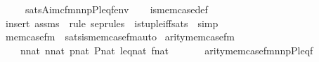 \begin{isabellebody}
\ \ \ \ {\isasymlongleftrightarrow}\ sats{\isacharparenleft}{\kern0pt}A{\isacharcomma}{\kern0pt}{\isacharquery}{\kern0pt}imc{\isacharunderscore}{\kern0pt}fm{\isacharparenleft}{\kern0pt}n{}{\isacharcomma}{\kern0pt}n{}{\isacharcomma}{\kern0pt}p{\isacharcomma}{\kern0pt}P{\isacharcomma}{\kern0pt}leq{\isacharcomma}{\kern0pt}f{\isacharparenright}{\kern0pt}{\isacharcomma}{\kern0pt}env{\isacharparenright}{\kern0pt}{\isachardoublequoteclose}\isanewline
%
\isadelimproof
\ \ %
\endisadelimproof
%
\isatagproof
{}\isamarkupfalse%
\ is{\isacharunderscore}{\kern0pt}mem{\isacharunderscore}{\kern0pt}case{\isacharunderscore}{\kern0pt}def\isanewline
\ \ \isamarkupfalse%
\ {\isacharparenleft}{\kern0pt}insert\ assms\ {\isacharsemicolon}{\kern0pt}\ {\isacharparenleft}{\kern0pt}rule\ sep{\isacharunderscore}{\kern0pt}rules{\isacharprime}{\kern0pt}\ \ is{\isacharunderscore}{\kern0pt}tuple{\isacharunderscore}{\kern0pt}iff{\isacharunderscore}{\kern0pt}sats\ {\isacharbar}{\kern0pt}\ simp{\isacharparenright}{\kern0pt}{\isacharplus}{\kern0pt}{\isacharparenright}{\kern0pt}%
\endisatagproof
{\isafoldproof}%
%
\isadelimproof
\isanewline
%
\endisadelimproof
\isanewline
%
\isadelimML
\isanewline
%
\endisadelimML
%
\isatagML
{}\isamarkupfalse%
\ {\isachardoublequoteopen}mem{\isacharunderscore}{\kern0pt}case{\isacharunderscore}{\kern0pt}fm{\isachardoublequoteclose}\ \ sats{\isacharunderscore}{\kern0pt}is{\isacharunderscore}{\kern0pt}mem{\isacharunderscore}{\kern0pt}case{\isacharunderscore}{\kern0pt}fm{\isacharunderscore}{\kern0pt}auto%
\endisatagML
{\isafoldML}%
%
\isadelimML
\isanewline
%
\endisadelimML
\isanewline
{}\isamarkupfalse%
\ arity{\isacharunderscore}{\kern0pt}mem{\isacharunderscore}{\kern0pt}case{\isacharunderscore}{\kern0pt}fm\ {\isacharcolon}{\kern0pt}\isanewline
\ \ \isanewline
\ \ \ \ {\isachardoublequoteopen}n{}{\isasymin}nat{\isachardoublequoteclose}\ {\isachardoublequoteopen}n{}{\isasymin}nat{\isachardoublequoteclose}\ {\isachardoublequoteopen}p{\isasymin}nat{\isachardoublequoteclose}\ {\isachardoublequoteopen}P{\isasymin}nat{\isachardoublequoteclose}\ {\isachardoublequoteopen}leq{\isasymin}nat{\isachardoublequoteclose}\ {\isachardoublequoteopen}f{\isasymin}nat{\isachardoublequoteclose}\isanewline
\ \ \isanewline
\ \ \ \ {\isachardoublequoteopen}arity{\isacharparenleft}{\kern0pt}mem{\isacharunderscore}{\kern0pt}case{\isacharunderscore}{\kern0pt}fm{\isacharparenleft}{\kern0pt}n{}{\isacharcomma}{\kern0pt}n{}{\isacharcomma}{\kern0pt}p{\isacharcomma}{\kern0pt}P{\isacharcomma}{\kern0pt}leq{\isacharcomma}{\kern0pt}f{\isacharparenright}{\kern0pt}{\isacharparenright}{\kern0pt}\ {\isacharequal}{\kern0pt}\isanewline

\end{isabellebody}
